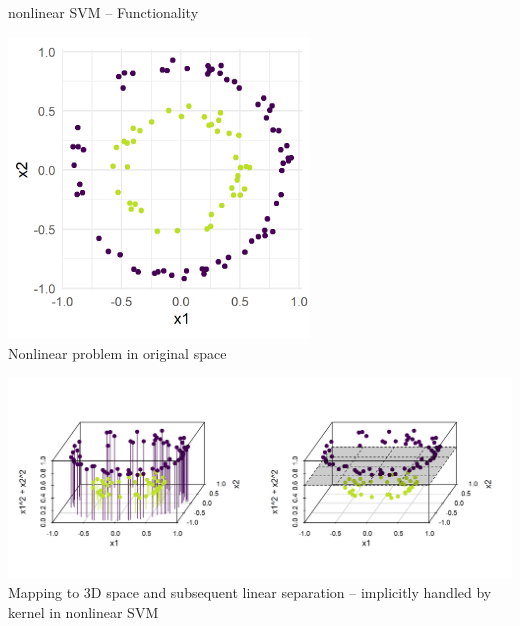 \begin{frame}{nonlinear SVM -- Functionality}
\begin{minipage}[b]{0.33\textwidth}
  \centering
  \includegraphics[width=0.6\textwidth]{
  ../slides/nonlinear-svm/figure/circles_ds.png} \\
  \tiny{Nonlinear problem in original space} 
\end{minipage}
\begin{minipage}[b]{0.66\textwidth}
  \centering
  \includegraphics[width=\textwidth, trim=0 30 0 0, clip]{
  ../slides/nonlinear-svm/figure/circles_feature_map.png} \\
  \tiny{Mapping to 3D space and subsequent linear separation -- implicitly 
  handled by kernel in nonlinear SVM}
\end{minipage}

\end{frame}


